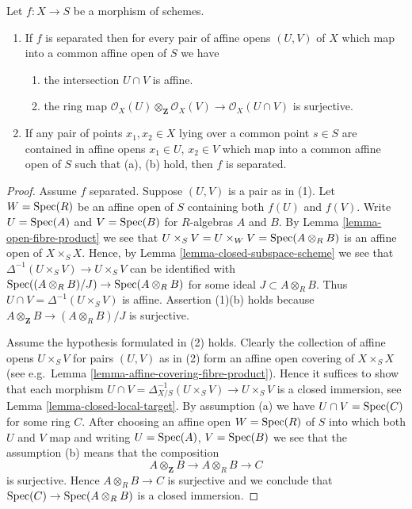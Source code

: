 \begin{lemma}
\label{lemma-characterize-separated}
Let $f : X \to S$ be a morphism of schemes.
\begin{enumerate}
\item If $f$ is separated then for every pair of affine
opens $(U, V)$ of $X$ which map into a
common affine open of $S$ we have
\begin{enumerate}
\item the intersection $U \cap V$ is affine.
\item the ring map
$\mathcal{O}_X(U) \otimes_{\mathbf{Z}} \mathcal{O}_X(V)
\to \mathcal{O}_X(U \cap V)$
is surjective.
\end{enumerate}
\item If any pair of points $x_1, x_2 \in X$ lying over a common
point $s \in S$ are contained in affine opens $x_1 \in U$,
$x_2 \in V$ which map into a common affine open of $S$ such
that (a), (b) hold, then $f$ is separated.
\end{enumerate}
\end{lemma}

\begin{proof}
Assume $f$ separated. Suppose $(U, V)$ is a pair as in (1).
Let $W = \mathop{\mathrm{Spec}}(R)$ be an affine open of $S$ containing
both $f(U)$ and $f(V)$. Write $U = \mathop{\mathrm{Spec}}(A)$ and
$V = \mathop{\mathrm{Spec}}(B)$ for $R$-algebras $A$ and $B$.
By Lemma \ref{lemma-open-fibre-product} we see that
$U \times_S V = U \times_W V = \mathop{\mathrm{Spec}}(A \otimes_R B)$
is an affine open of $X \times_S X$. Hence, by
Lemma \ref{lemma-closed-subspace-scheme} we see that
$\Delta^{-1}(U \times_S V) \to U \times_S V$
can be identified with $\mathop{\mathrm{Spec}}((A \otimes_R B)/J) \to \mathop{\mathrm{Spec}}(A \otimes_R B)$
for some ideal $J \subset A \otimes_R B$.
Thus $U \cap V = \Delta^{-1}(U \times_S V)$ is affine.
Assertion (1)(b) holds because
$A \otimes_{\mathbf{Z}} B \to (A \otimes_R B)/J$ is surjective.

\medskip\noindent
Assume the hypothesis formulated in (2) holds.
Clearly the collection of affine opens $U \times_S V$
for pairs $(U, V)$ as in (2) form an affine open covering
of $X \times_S X$ (see e.g.\ Lemma \ref{lemma-affine-covering-fibre-product}).
Hence it suffices to show that each morphism
$U \cap V = \Delta_{X/S}^{-1}(U \times_S V) \to U \times_S V$
is a closed immersion, see Lemma \ref{lemma-closed-local-target}.
By assumption (a) we have $U \cap V = \mathop{\mathrm{Spec}}(C)$ for some ring $C$.
After choosing an affine open $W = \mathop{\mathrm{Spec}}(R)$ of $S$
into which both $U$ and $V$ map and writing $U = \mathop{\mathrm{Spec}}(A)$,
$V = \mathop{\mathrm{Spec}}(B)$ we see that the assumption (b) means
that the composition
$$
A \otimes_{\mathbf{Z}} B \to A \otimes_R B \to C
$$
is surjective. Hence $A \otimes_R B \to C$ is surjective and
we conclude that $\mathop{\mathrm{Spec}}(C) \to \mathop{\mathrm{Spec}}(A \otimes_R B)$
is a closed immersion.
\end{proof}

